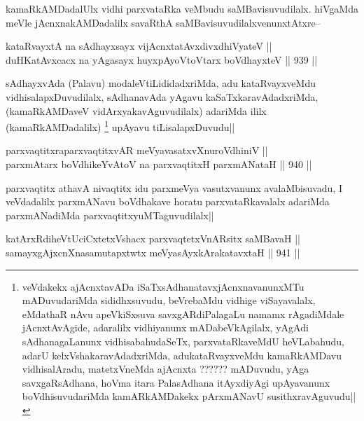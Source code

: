 \begin{artha}
kamaRkAMDadalUlx vidhi parxvataRka veMbudu saMBavisuvudilalx. hiVgaMda meVle jAcnxnakAMDadalilx savaRthA saMBavisuvudilalxvenunxtAtxre--
\end{artha}

\begin{shl}
kataRvayxtA na sAdhayxsayx vijAcnxtatAvxdivxdhiVyateV || \\
duHKatAvxcacx na yAgasayx huyxpAyoV\s toV\s tarx boVdhayxteV ||  939 ||  
\end{shl}

\begin{artha}
sAdhayxvAda (Palavu) modaleVtiLididadxriMda, adu kataRvayxveMdu vidhisalapxDuvudilalx, sAdhanavAda yAgavu kaSaTxkaravAdadxriMda,(kamaRkAMDaveV vidArxyakavAguvudilalx) adariMda ililx (kamaRkAMDadalilx) \footnote{veVdakekx ajAcnxtavADa iSaTxsAdhanatavxjAcnxnavanunxMTu mADuvudariMda sididhxsuvudu, beVrebaMdu vidhige viSayavalalx, eMdathaR nAvu apeVkiSxsuva savxgARdiPalagaLu namamx rAgadiMdale jAcnxtAvAgide, adaralilx vidhiyanunx mADabeVkAgilalx, yAgAdi sAdhanagaLanunx vidhisabahudaSeTx, parxvataRkaveMdU heVLabahudu, adarU kelxVshakaravAdadxriMda, adukataRvayxveMdu kamaRkAMDavu vidhisalAradu, matetxVneMda ajAcnxta ?????? mADuvudu, yAga savxgaRsAdhana, hoVma itara PalasAdhana itAyxdiyAgi upAyavanunx boVdhisuvudariMda kamARkAMDakekx pArxmANavU susithxravAguvudu||} upAyavu tiLisalapxDuvudu||
\end{artha}


\begin{shl}
parxvaqtitxraparxvaqtitxvAR meVyavasatxvXnuroVdhiniV || \\
parxmA\s tarx boVdhikeYvAtoV na parxvaqtitxH parxmANataH ||  940 ||  
\end{shl}

\begin{artha}
parxvaqtitx athavA nivaqtitx idu parxmeVya vasutxvanunx avalaMbisuvadu, I veVdadalilx parxmANavu boVdhakave horatu parxvataRkavalalx adariMda parxmANadiMda parxvaqtitxyuMTaguvudilalx||
\end{artha}

\begin{shl}
katArxRdiheVtUciCxtetxVshacx parxvaqtetxVnARsitx saMBavaH || \\
samayxgAjxcnXnasamutapxtwtx meVyasAyxkArakatavxtaH ||  941 ||  
\end{shl}


